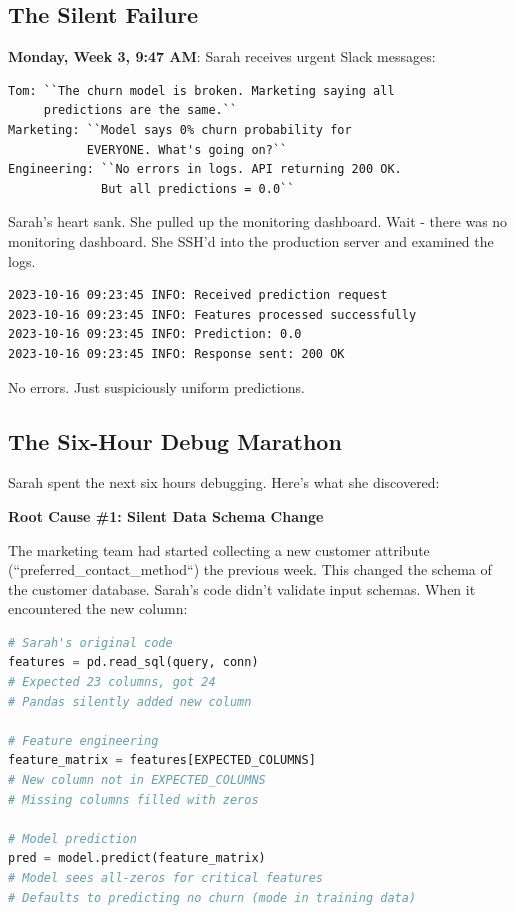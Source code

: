 \subsection{The Silent Failure}

\textbf{Monday, Week 3, 9:47 AM}: Sarah receives urgent Slack messages:

\begin{verbatim}
Tom: ``The churn model is broken. Marketing saying all
     predictions are the same.``
Marketing: ``Model says 0% churn probability for
           EVERYONE. What's going on?``
Engineering: ``No errors in logs. API returning 200 OK.
             But all predictions = 0.0``
\end{verbatim}

Sarah's heart sank. She pulled up the monitoring dashboard. Wait - there was no monitoring dashboard. She SSH'd into the production server and examined the logs.

\begin{verbatim}
2023-10-16 09:23:45 INFO: Received prediction request
2023-10-16 09:23:45 INFO: Features processed successfully
2023-10-16 09:23:45 INFO: Prediction: 0.0
2023-10-16 09:23:45 INFO: Response sent: 200 OK
\end{verbatim}

No errors. Just suspiciously uniform predictions.

\subsection{The Six-Hour Debug Marathon}

Sarah spent the next six hours debugging. Here's what she discovered:

\textbf{Root Cause \#1: Silent Data Schema Change}

The marketing team had started collecting a new customer attribute (``preferred\_contact\_method``) the previous week. This changed the schema of the customer database. Sarah's code didn't validate input schemas. When it encountered the new column:

\begin{lstlisting}[language=Python]
# Sarah's original code
features = pd.read_sql(query, conn)
# Expected 23 columns, got 24
# Pandas silently added new column

# Feature engineering
feature_matrix = features[EXPECTED_COLUMNS]
# New column not in EXPECTED_COLUMNS
# Missing columns filled with zeros

# Model prediction
pred = model.predict(feature_matrix)
# Model sees all-zeros for critical features
# Defaults to predicting no churn (mode in training data)
\end{lstlisting}


